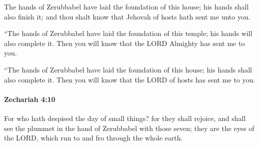 			\begin{versebox}
					\item[BHS] 
					\item[LXX] 
					\item[ASV] The hands of Zerubbabel have laid the foundation of this house; his hands shall also finish it; and thou shalt know that Jehovah of hosts hath sent me unto you.
					\item[NIV] “The hands of Zerubbabel have laid the foundation of this temple; his hands will also complete it. Then you will know that the LORD Almighty has sent me to you.
					\item[NRSV] “The hands of Zerubbabel have laid the foundation of this house; his hands shall also complete it. Then you will know that the LORD of hosts has sent me to you.
			\end{versebox}

		\paragraph{Zechariah 4:10} %
			\label{ZECHARIAH-4-10}

			For who hath despised the day of small things? for they shall rejoice, and shall see the plummet in the hand of Zerubbabel with those seven; they are the eyes of the LORD, which run to and fro through the whole earth.

